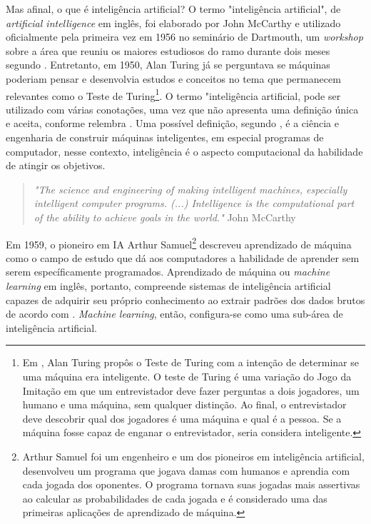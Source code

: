 Mas afinal, o que é inteligência artificial? O termo 
"inteligência artificial", de \textit{artificial intelligence} 
em inglês, foi elaborado por John McCarthy e utilizado 
oficialmente pela primeira vez em 1956 no seminário de 
Dartmouth, um \textit{workshop} sobre a área que reuniu os 
maiores estudiosos do ramo durante dois meses segundo \cite{aima}.
Entretanto, em 1950, Alan Turing já se perguntava se máquinas 
poderiam pensar e desenvolvia estudos e conceitos no tema que permanecem relevantes
como o Teste de Turing\footnote{Em \cite{turing}, Alan Turing propôs o 
Teste de Turing com a intenção de determinar se uma máquina era inteligente. O teste de Turing é uma variação 
do Jogo da Imitação em que um entrevistador deve fazer perguntas a dois jogadores, um 
humano e uma máquina, sem qualquer distinção. Ao final, o entrevistador deve
descobrir qual dos jogadores é uma máquina e qual é a pessoa. Se 
a máquina fosse capaz de enganar o entrevistador, seria considera
inteligente.}.
O termo "inteligência artificial, pode ser utilizado com
várias conotações, uma vez que não apresenta uma definição 
única e aceita, conforme 
relembra \cite{wang2019defining}. Uma possível definição,
segundo \cite{what-is-ai}, é a ciência e engenharia de 
construir máquinas inteligentes, em especial programas 
de computador, nesse contexto, inteligência é o aspecto
computacional da habilidade de atingir os objetivos.

\begin{quote}
  \textit{"The science and
  engineering of making intelligent machines, 
  especially intelligent computer programs. (...)
  Intelligence is the computational part of the ability 
  to achieve goals in the world."} John McCarthy
\end{quote}

Em 1959, o pioneiro em IA Arthur Samuel\footnote{Arthur Samuel
foi um engenheiro e um dos pioneiros em inteligência artificial,
desenvolveu um programa que jogava damas com humanos e aprendia
com cada jogada dos oponentes. O programa tornava suas jogadas mais 
assertivas ao calcular as probabilidades de cada jogada e é 
considerado uma das primeiras aplicações de aprendizado de máquina.
} descreveu 
aprendizado de máquina como o campo de estudo que dá aos 
computadores a habilidade de aprender sem serem específicamente
programados. Aprendizado de máquina ou \textit{machine learning} 
em inglês, portanto, compreende sistemas de inteligência 
artificial capazes de adquirir seu próprio conhecimento 
ao extrair padrões dos dados brutos de acordo com \cite{Goodfellow-et-al-2016}.
\textit{Machine learning}, então, configura-se como uma 
sub-área de inteligência artificial.


